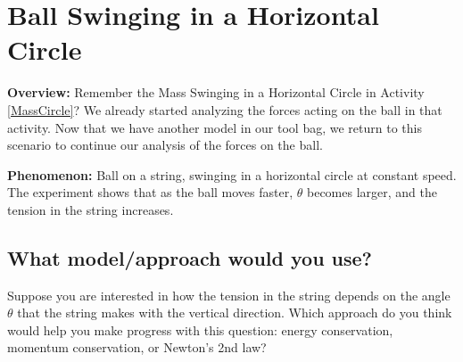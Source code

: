 \section{Ball Swinging in a Horizontal Circle}

\begin{overview}

	\textbf{Overview:} Remember the Mass Swinging in a Horizontal Circle in Activity \ref{MassCircle}? We already started analyzing the forces acting on the ball in that activity. Now that we have another model in our tool bag, we return to this scenario to continue our analysis of the forces on the ball.
	
\end{overview}

\noindent\textbf{Phenomenon:} Ball on a string, swinging in a horizontal circle at constant speed. The experiment shows that as the ball moves faster, $\theta$ becomes larger, and the tension in the string increases.

\begin{center}
\end{center}


\subsection*{What model/approach would you use?}

Suppose you are interested in how the tension in the string depends on the angle $\theta$ that the string makes with the vertical direction. Which approach do you think would help you make progress with this question: energy conservation, momentum %
conservation, or Newton's 2nd law?\\

